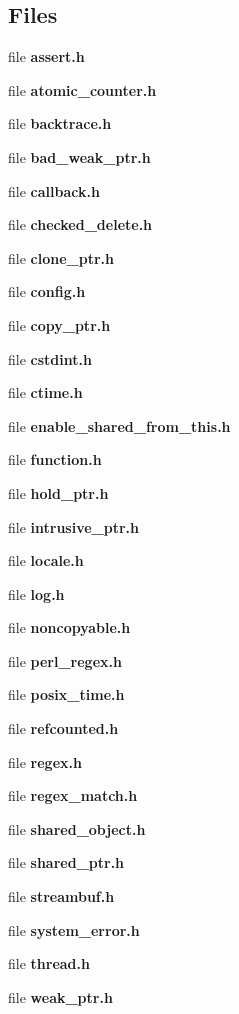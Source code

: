 \subsection*{Files}
\begin{DoxyCompactItemize}
\item 
file {\bfseries assert.\-h}
\item 
file {\bfseries atomic\-\_\-counter.\-h}
\item 
file {\bfseries backtrace.\-h}
\item 
file {\bfseries bad\-\_\-weak\-\_\-ptr.\-h}
\item 
file {\bfseries callback.\-h}
\item 
file {\bfseries checked\-\_\-delete.\-h}
\item 
file {\bfseries clone\-\_\-ptr.\-h}
\item 
file {\bfseries config.\-h}
\item 
file {\bfseries copy\-\_\-ptr.\-h}
\item 
file {\bfseries cstdint.\-h}
\item 
file {\bfseries ctime.\-h}
\item 
file {\bfseries enable\-\_\-shared\-\_\-from\-\_\-this.\-h}
\item 
file {\bfseries function.\-h}
\item 
file {\bfseries hold\-\_\-ptr.\-h}
\item 
file {\bfseries intrusive\-\_\-ptr.\-h}
\item 
file {\bfseries locale.\-h}
\item 
file {\bf log.\-h}
\item 
file {\bfseries noncopyable.\-h}
\item 
file {\bfseries perl\-\_\-regex.\-h}
\item 
file {\bfseries posix\-\_\-time.\-h}
\item 
file {\bfseries refcounted.\-h}
\item 
file {\bfseries regex.\-h}
\item 
file {\bfseries regex\-\_\-match.\-h}
\item 
file {\bfseries shared\-\_\-object.\-h}
\item 
file {\bfseries shared\-\_\-ptr.\-h}
\item 
file {\bfseries streambuf.\-h}
\item 
file {\bfseries system\-\_\-error.\-h}
\item 
file {\bfseries thread.\-h}
\item 
file {\bfseries weak\-\_\-ptr.\-h}
\end{DoxyCompactItemize}

